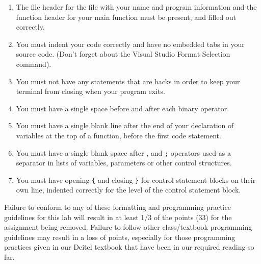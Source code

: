 \documentclass[11pt]{article}
\begin{document}
\begin{enumerate}
\item The file header for the file with your name and program information
and the function header for your main function must be present, and
filled out correctly.
\item You must indent your code correctly and have no embedded tabs in
your source code. (Don't forget about the Visual Studio Format
Selection command).
\item You must not have any statements that are hacks in order to keep
your terminal from closing when your program exits.
\item You must have a single space before and after each binary operator.
\item You must have a single blank line after the end of your declaration
of variables at the top of a function, before the first code
statement.
\item You must have a single blank space after , and \verb~;~ operators used as a
separator in lists of variables, parameters or other control
structures.
\item You must have opening \verb~{~ and closing \verb~}~ for control statement blocks
on their own line, indented correctly for the level of the control
statement block.
\end{enumerate}

Failure to conform to any of these formatting and programming practice
guidelines for this lab will result in at least 1/3 of the points (33)
for the assignment being removed.  Failure to follow other
class/textbook programming guidelines may result in a loss of points,
especially for those programming practices given in our Deitel
textbook that have been in our required reading so far.
\end{document}
